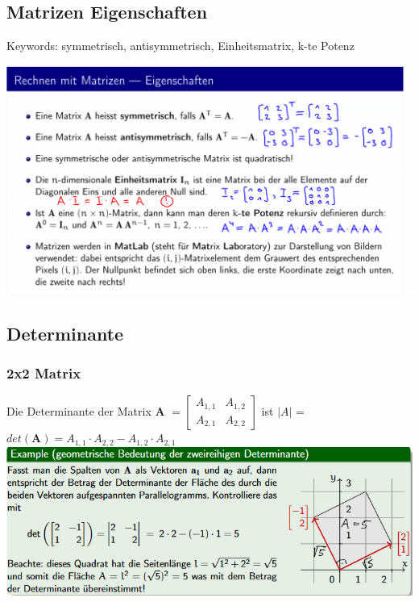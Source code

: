 \documentclass[12pt]{scrartcl}
\begin{document}
\subsection{Matrizen Eigenschaften}
Keywords: symmetrisch, antisymmetrisch, Einheitsmatrix, k-te Potenz

\includegraphics[width=16cm]{img/matrizen_eigenschaften.png}


\newpage
\subsection{Determinante}
\subsubsection{2x2 Matrix}
Die Determinante der Matrix \textbf{A} $= \begin{bmatrix}
    A_{1,1} & A_{1,2}\\
    A_{2,1} & A_{2,2}
\end{bmatrix}$
ist $|A|$ = $det(\textbf{A}) = A_{1,1} \cdot A_{2,2} - A_{1,2} \cdot A_{2,1}$\\

\includegraphics[width=14cm]{img/determinante.png}
\end{document}

